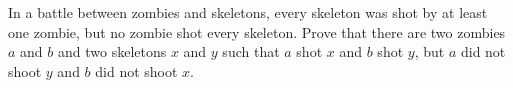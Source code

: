 In a battle between zombies and skeletons, every skeleton was shot by at least one zombie, but no zombie shot every skeleton. Prove that there are two zombies $a$ and $b$ and two skeletons $x$ and $y$ such that $a$ shot $x$ and $b$ shot $y$, but $a$ did not shoot $y$ and $b$ did not shoot $x$.
